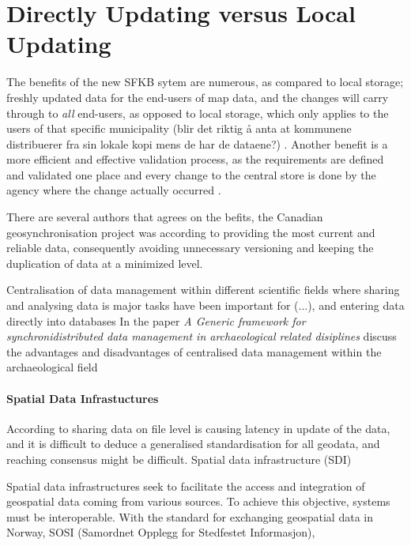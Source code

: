 \chapter{Directly Updating versus Local Updating}
The benefits of the new SFKB sytem are numerous, as compared to local storage; freshly updated data for the end-users of map data, and the changes will carry through to \textit{all} end-users, as opposed to local storage, which only applies to the users of that specific municipality (blir det riktig å anta at kommunene distribuerer fra sin lokale kopi mens de har de dataene?) \citep{Dontigney2017}. Another benefit is a more efficient and effective validation process, as the requirements are defined and validated one place and every change to the central store is done by the agency where the change actually occurred \citep{Kartverket2017e}. 

There are several authors that agrees on the befits, the Canadian geosynchronisation project was according to \cite{Reichardt2012} providing the most current and reliable data, consequently avoiding unnecessary versioning and keeping the duplication of data at a minimized level. 


Centralisation of data management within different scientific fields where sharing and analysing data is major tasks have been important for (...), and entering data directly into databases     In the paper \textit{A Generic framework for synchronidistributed data management in archaeological related disiplines} \cite{LOHRER2016558} discuss the advantages and disadvantages of centralised data management within the archaeological field

\subsubsection{Spatial Data Infrastuctures}

According to \cite{Peng2005} sharing data on file level is causing latency in update of the data, and it is difficult to deduce a generalised standardisation for all geodata, and reaching consensus might be difficult.  Spatial data infrastructure (SDI) 

Spatial data infrastructures seek to facilitate the access and integration of geospatial data coming from various sources. To achieve this objective, systems must be interoperable. \cite{giuliani2013} 
With the standard for exchanging geospatial data in Norway, SOSI (Samordnet Opplegg for Stedfestet Informasjon), 

